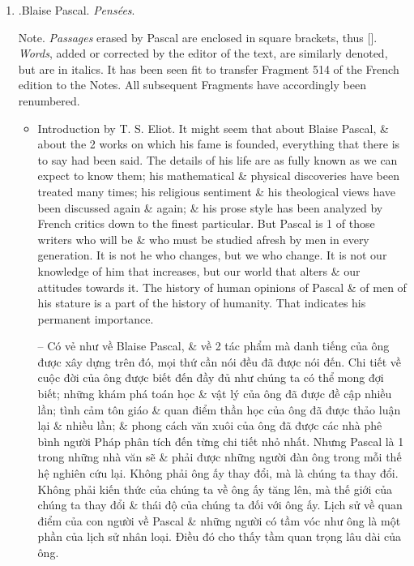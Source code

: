 \documentclass{article}
\begin{document}
\begin{enumerate}
	\item \cite{Pascal_pensees}.{\sc Blaise Pascal}. {\it Pens\'ees}.
	
	{\sf Note.} {\it Passages} erased by {\sc Pascal} are enclosed in square brackets, thus []. {\it Words}, added or corrected by the editor of the text, are similarly denoted, but are in italics. It has been seen fit to transfer Fragment 514 of the French edition to the Notes. All subsequent Fragments have accordingly been renumbered.
	\begin{itemize}
		\item {\sf Introduction by {\sc T. S. Eliot}.} It might seem that about {\sc Blaise Pascal}, \& about the 2 works on which his fame is founded, everything that there is to say had been said. The details of his life are as fully known as we can expect to know them; his mathematical \& physical discoveries have been treated many times; his religious sentiment \& his theological views have been discussed again \& again; \& his prose style has been analyzed by French critics down to the finest particular. But {\sc Pascal} is 1 of those writers who will be \& who must be studied afresh by men in every generation. It is not he who changes, but we who change. It is not our knowledge of him that increases, but our world that alters \& our attitudes towards it. The history of human opinions of {\sc Pascal} \& of men of his stature is a part of the history of humanity. That indicates his permanent importance.
		
		-- Có vẻ như về {\sc Blaise Pascal}, \& về 2 tác phẩm mà danh tiếng của ông được xây dựng trên đó, mọi thứ cần nói đều đã được nói đến. Chi tiết về cuộc đời của ông được biết đến đầy đủ như chúng ta có thể mong đợi biết; những khám phá toán học \& vật lý của ông đã được đề cập nhiều lần; tình cảm tôn giáo \& quan điểm thần học của ông đã được thảo luận lại \& nhiều lần; \& phong cách văn xuôi của ông đã được các nhà phê bình người Pháp phân tích đến từng chi tiết nhỏ nhất. Nhưng {\sc Pascal} là 1 trong những nhà văn sẽ \& phải được những người đàn ông trong mỗi thế hệ nghiên cứu lại. Không phải ông ấy thay đổi, mà là chúng ta thay đổi. Không phải kiến thức của chúng ta về ông ấy tăng lên, mà thế giới của chúng ta thay đổi \& thái độ của chúng ta đối với ông ấy. Lịch sử về quan điểm của con người về {\sc Pascal} \& những người có tầm vóc như ông là một phần của lịch sử nhân loại. Điều đó cho thấy tầm quan trọng lâu dài của ông.
		

\end{itemize}
\end{enumerate}
\end{document}
